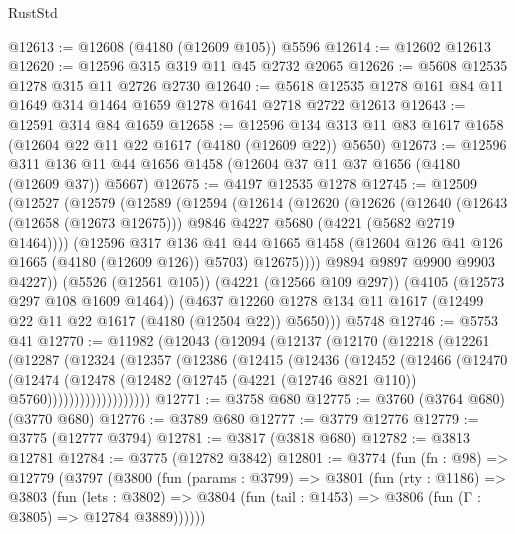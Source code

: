 \begin{lexlean}{RustStd}
\begin{coremodule}
{\begin{coremodule}
{{{{{{{{{{{{{{{{{{{{{{{{{{{{{{{@12613 := @12608 (@4180 (@12609 @105)) @5596
@12614 := @12602 @12613
@12620 := @12596 @315 @319 @11 @45 @2732 @2065
@12626 := @5608 @12535 @1278 @315 @11 @2726 @2730
@12640 := @5618 @12535 @1278 @161 @84 @11 @1649 @314 @1464 @1659 @1278 @1641 @2718 @2722 @12613
@12643 := @12591 @314 @84 @1659
@12658 := @12596 @134 @313 @11 @83 @1617 @1658 (@12604 @22 @11 @22 @1617 (@4180 (@12609 @22)) @5650)
@12673 := @12596 @311 @136 @11 @44 @1656 @1458 (@12604 @37 @11 @37 @1656 (@4180 (@12609 @37)) @5667)
@12675 := @4197 @12535 @1278
@12745 := @12509
    (@12527
      (@12579
        (@12589
          (@12594
            (@12614
              (@12620
                (@12626
                  (@12640
                    (@12643 (@12658 (@12673 @12675)))
                    @9846
                    @4227
                    @5680
                    (@4221 (@5682 @2719 @1464))))
                (@12596
                  @317
                  @136
                  @41
                  @44
                  @1665
                  @1458
                  (@12604 @126 @41 @126 @1665 (@4180 (@12609 @126)) @5703)
                  @12675))))
          @9894
          @9897
          @9900
          @9903
          @4227))
      (@5526 (@12561 @105))
      (@4221 (@12566 @109 @297))
      (@4105 (@12573 @297 @108 @1609 @1464))
      (@4637 @12260 @1278 @134 @11 @1617 (@12499 @22 @11 @22 @1617 (@4180 (@12504 @22)) @5650)))
    @5748
@12746 := @5753 @41
@12770 := @11982
    (@12043
      (@12094
        (@12137
          (@12170
            (@12218
              (@12261
                (@12287
                  (@12324
                    (@12357
                      (@12386
                        (@12415
                          (@12436
                            (@12452
                              (@12466
                                (@12470
                                  (@12474
                                    (@12478
                                      (@12482
                                        (@12745 (@4221 (@12746 @821 @110)) @5760)))))))))))))))))))
@12771 := @3758 @680
@12775 := @3760 (@3764 @680) (@3770 @680)
@12776 := @3789 @680
@12777 := @3779 @12776
@12779 := @3775 (@12777 @3794)
@12781 := @3817 (@3818 @680)
@12782 := @3813 @12781
@12784 := @3775 (@12782 @3842)
@12801 := @3774
    (fun (fn : @98) =>
    @12779
      (@3797
        (@3800
          (fun (params : @3799) =>
          @3801
            (fun (rty : @1186) =>
            @3803
              (fun (lets : @3802) =>
              @3804 (fun (tail : @1453) => @3806 (fun (Γ : @3805) => @12784 @3889))))))
}}}}}}}}}}}}}}}}}}}}}}}}}}}}}}}
\end{coremodule}}
\end{coremodule}
\end{lexlean}
